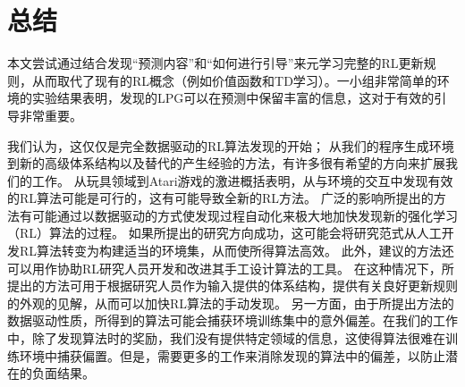 \chapter{总结}
\label{cha:experiment}

本文尝试通过结合发现“预测内容”和“如何进行引导”来元学习完整的RL更新规则，从而取代了现有的RL概念（例如价值函数和TD学习）。一小组非常简单的环境的实验结果表明，发现的LPG可以在预测中保留丰富的信息，这对于有效的引导非常重要。

我们认为，这仅仅是完全数据驱动的RL算法发现的开始；
从我们的程序生成环境到新的高级体系结构以及替代的产生经验的方法，有许多很有希望的方向来扩展我们的工作。
从玩具领域到Atari游戏的激进概括表明，从与环境的交互中发现有效的RL算法可能是可行的，这有可能导致全新的RL方法。
广泛的影响所提出的方法有可能通过以数据驱动的方式使发现过程自动化来极大地加快发现新的强化学习（RL）算法的过程。
如果所提出的研究方向成功，这可能会将研究范式从人工开发RL算法转变为构建适当的环境集，从而使所得算法高效。
此外，建议的方法还可以用作协助RL研究人员开发和改进其手工设计算法的工具。
在这种情况下，所提出的方法可用于根据研究人员作为输入提供的体系结构，提供有关良好更新规则的外观的见解，从而可以加快RL算法的手动发现。
另一方面，由于所提出方法的数据驱动性质，所得到的算法可能会捕获环境训练集中的意外偏差。在我们的工作中，除了发现算法时的奖励，我们没有提供特定领域的信息，这使得算法很难在训练环境中捕获偏置。但是，需要更多的工作来消除发现的算法中的偏差，以防止潜在的负面结果。
